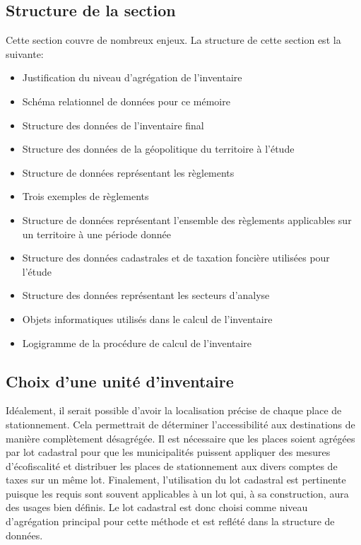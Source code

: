     \subsection{Structure de la section}
        Cette section couvre de nombreux enjeux. La structure de cette section est la suivante: 
        \begin{itemize}
            \item Justification du niveau d'agrégation de l'inventaire
            \item Schéma relationnel de données pour ce mémoire
            \item Structure des données de l'inventaire final
            \item Structure des données de la géopolitique du territoire à l'étude
            \item Structure de données représentant les règlements
            \item Trois exemples de règlements
            \item Structure de données représentant l'ensemble des règlements applicables sur un territoire à une période donnée
            \item Structure des données cadastrales et de taxation foncière utilisées pour l'étude
            \item Structure des données représentant les secteurs d'analyse
            \item Objets informatiques utilisés dans le calcul de l'inventaire
            \item Logigramme de la procédure de calcul de l'inventaire
        \end{itemize}
    \subsection{Choix d'une unité d'inventaire}
    Idéalement, il serait possible d'avoir la localisation précise de chaque place de stationnement. Cela permettrait de déterminer l'accessibilité aux destinations de manière complètement désagrégée. Il est nécessaire que les places soient agrégées par lot cadastral pour que les municipalités puissent appliquer des mesures d'écofiscalité et distribuer les places de stationnement aux divers comptes de taxes sur un même lot. Finalement, l'utilisation du lot cadastral est pertinente puisque les requis sont souvent applicables à un lot qui, à sa construction, aura des usages bien définis. Le lot cadastral est donc choisi comme niveau d'agrégation principal pour cette méthode et est reflété dans la structure de données.
